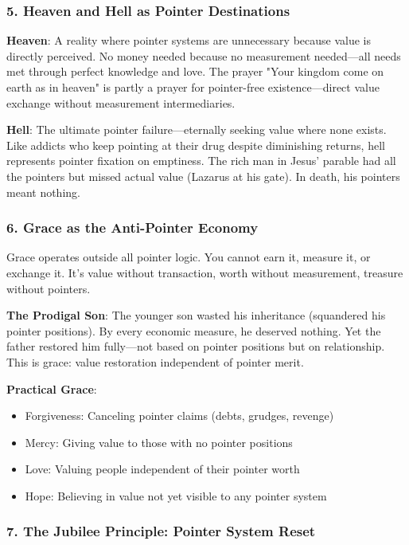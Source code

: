 \documentclass[11pt,oneside]{book}
\begin{document}
\subsubsection{5. Heaven and Hell as Pointer Destinations}

\textbf{Heaven}: A reality where pointer systems are unnecessary because value is directly perceived. No money needed because no measurement needed—all needs met through perfect knowledge and love. The prayer "Your kingdom come on earth as in heaven" is partly a prayer for pointer-free existence—direct value exchange without measurement intermediaries.

\textbf{Hell}: The ultimate pointer failure—eternally seeking value where none exists. Like addicts who keep pointing at their drug despite diminishing returns, hell represents pointer fixation on emptiness. The rich man in Jesus' parable had all the pointers but missed actual value (Lazarus at his gate). In death, his pointers meant nothing.

\subsubsection{6. Grace as the Anti-Pointer Economy}

Grace operates outside all pointer logic. You cannot earn it, measure it, or exchange it. It's value without transaction, worth without measurement, treasure without pointers.

\textbf{The Prodigal Son}: The younger son wasted his inheritance (squandered his pointer positions). By every economic measure, he deserved nothing. Yet the father restored him fully—not based on pointer positions but on relationship. This is grace: value restoration independent of pointer merit.

\textbf{Practical Grace}:
\begin{itemize}
\item Forgiveness: Canceling pointer claims (debts, grudges, revenge)
\item Mercy: Giving value to those with no pointer positions
\item Love: Valuing people independent of their pointer worth
\item Hope: Believing in value not yet visible to any pointer system
\end{itemize}

\subsubsection{7. The Jubilee Principle: Pointer System Reset}
\end{document}

